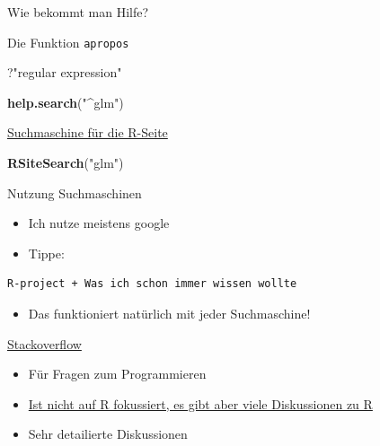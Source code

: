 \documentclass[ignorenonframetext,]{beamer}
\newenvironment{Shaded}{}{}
\newcommand{\KeywordTok}[1]{\textcolor[rgb]{0.00,0.44,0.13}{\textbf{{#1}}}}
\newcommand{\StringTok}[1]{\textcolor[rgb]{0.25,0.44,0.63}{{#1}}}
\newcommand{\NormalTok}[1]{{#1}}
\providecommand{\tightlist}{%
\setlength{\itemsep}{0pt}\setlength{\parskip}{0pt}}
\begin{document}
\begin{frame}[fragile]{Wie bekommt man Hilfe?}
\begin{block}{Die Funktion \texttt{apropos}}
\begin{Shaded}
\begin{Highlighting}[]
\NormalTok{?}\StringTok{"regular expression"}
\end{Highlighting}
\end{Shaded}

\begin{Shaded}
\begin{Highlighting}[]
\KeywordTok{help.search}\NormalTok{(}\StringTok{"^glm"}\NormalTok{)}
\end{Highlighting}
\end{Shaded}

\end{block}

\begin{block}{\href{http://search.r-project.org/cgi-bin/namazu.cgi?query=glm\&max=20\&result=normal\&sort=score\&idxname=functions\&idxname=vignettes\&idxname=views}{Suchmaschine
für die R-Seite}}

\begin{Shaded}
\begin{Highlighting}[]
\KeywordTok{RSiteSearch}\NormalTok{(}\StringTok{"glm"}\NormalTok{)}
\end{Highlighting}
\end{Shaded}

\end{block}

\begin{block}{Nutzung Suchmaschinen}

\begin{itemize}
\tightlist
\item
  Ich nutze meistens google
\item
  Tippe:
\end{itemize}

\begin{verbatim}
R-project + Was ich schon immer wissen wollte
\end{verbatim}

\begin{itemize}
\tightlist
\item
  Das funktioniert natürlich mit jeder Suchmaschine!
\end{itemize}

\end{block}

\begin{block}{\href{http://stackoverflow.com/}{Stackoverflow}}

\begin{itemize}
\tightlist
\item
  Für Fragen zum Programmieren
\item
  \href{https://stackoverflow.com/tags/r/info}{Ist nicht auf R
  fokussiert, es gibt aber viele Diskussionen zu R}
\item
  Sehr detailierte Diskussionen
\end{itemize}


\end{block}
\end{frame}
\end{document}
